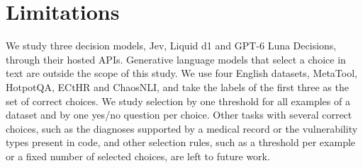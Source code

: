 \section*{Limitations}
We study three decision models, Jev, Liquid d1 and GPT-6 Luna Decisions, through their hosted APIs. Generative language models that select a choice in text are outside the scope of this study. We use four English datasets, MetaTool, HotpotQA, ECtHR and ChaosNLI, and take the labels of the first three as the set of correct choices. We study selection by one threshold for all examples of a dataset and by one yes/no question per choice. Other tasks with several correct choices, such as the diagnoses supported by a medical record or the vulnerability types present in code, and other selection rules, such as a threshold per example or a fixed number of selected choices, are left to future work.
